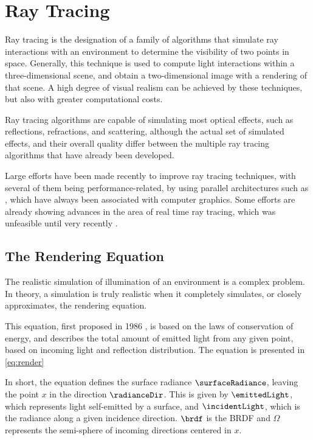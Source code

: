 \documentclass[main.tex]{subfiles}
\begin{document}
\section{Ray Tracing} \label{section:ray_tracing}

Ray tracing is the designation of a family of algorithms that simulate ray interactions with an environment to determine the visibility of two points in space.
Generally, this technique is used to compute light interactions within a three-dimensional scene, and obtain a two-dimensional image with a rendering of that scene. A high degree of visual realism can be achieved by these techniques, but also with greater computational costs.

Ray tracing algorithms are capable of simulating most optical effects, such as reflections, refractions, and scattering, although the actual set of simulated effects, and their overall quality differ between the multiple ray tracing algorithms that have already been developed.

Large efforts have been made recently to improve ray tracing techniques, with several of them being performance-related, by using parallel architectures such as \gpus, which have always been associated with computer graphics. Some efforts are already showing advances in the area of real time ray tracing, which was unfeasible until very recently \cite{parker2010optix,huss2004real}.


\subsection{The Rendering Equation}

The realistic simulation of illumination of an environment is a complex problem. In theory, a simulation is truly realistic when it completely simulates, or closely approximates, the rendering equation.

This equation, first proposed in 1986 \cite{kajiya1986rendering}, is based on the laws of conservation of energy, and describes the total amount of emitted light from any given point, based on incoming light and reflection distribution. The equation is presented in \cref{eq:render}


In short, the equation defines the surface radiance $\surfaceRadiance$, leaving the point $x$ in the direction $\radianceDir$. This is given by $\emittedLight$, which represents light self-emitted by a surface, and $\incidentLight$, which is the radiance along a given incidence direction. $\brdf$ is the \acf{BRDF} and $\Omega$ represents the semi-sphere of incoming directions centered in $x$.
\end{document}
